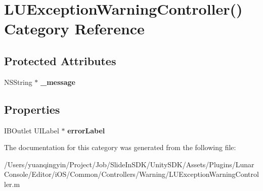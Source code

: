 \hypertarget{category_l_u_exception_warning_controller_07_08}{}\section{L\+U\+Exception\+Warning\+Controller() Category Reference}
\label{category_l_u_exception_warning_controller_07_08}
\subsection*{Protected Attributes}
\begin{DoxyCompactItemize}
\item 
\mbox{\label{category_l_u_exception_warning_controller_07_08_a1e7c1bb991dacaa183aa2fefa41dd85a}} 
N\+S\+String $\ast$ {\bfseries \+\_\+message}
\end{DoxyCompactItemize}
\subsection*{Properties}
\begin{DoxyCompactItemize}
\item 
\mbox{\label{category_l_u_exception_warning_controller_07_08_ae522b36845e63fe27b5f15f1bc02d4af}} 
I\+B\+Outlet U\+I\+Label $\ast$ {\bfseries error\+Label}
\end{DoxyCompactItemize}


The documentation for this category was generated from the following file\+:\begin{DoxyCompactItemize}
\item 
/\+Users/yuanqingyin/\+Project/\+Job/\+Slide\+In\+S\+D\+K/\+Unity\+S\+D\+K/\+Assets/\+Plugins/\+Lunar\+Console/\+Editor/i\+O\+S/\+Common/\+Controllers/\+Warning/L\+U\+Exception\+Warning\+Controller.\+m\end{DoxyCompactItemize}
